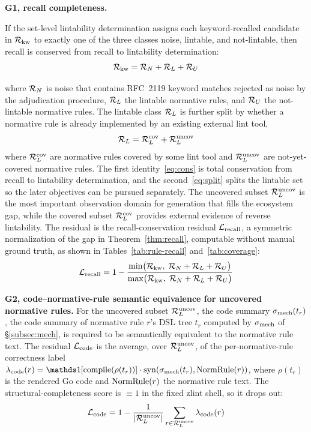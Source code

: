 \medskip
\noindent\textbf{G1, recall completeness.}
\begin{theorem}\label{thm:recall}
If the set-level lintability determination assigns each keyword-recalled candidate in
$\mathcal{R}_{\mathrm{kw}}$ to exactly one of the three classes noise, lintable, and
not-lintable, then recall is conserved from recall to lintability
determination:
\begin{equation}\label{eq:cons}
  \mathcal{R}_{\mathrm{kw}} = \mathcal{R}_N + \mathcal{R}_L + \mathcal{R}_U
\end{equation}
\end{theorem}
\noindent where $\mathcal{R}_N$ is noise that contains
RFC~2119 keyword matches rejected as noise by the adjudication procedure,
$\mathcal{R}_L$ the lintable normative rules, and $\mathcal{R}_U$
the not-lintable normative rules. The lintable class $\mathcal{R}_L$ is further split by whether
a normative rule is already implemented by an existing external lint tool,
\begin{equation}\label{eq:split}
  \mathcal{R}_L = \mathcal{R}_L^{\mathrm{cov}} + \mathcal{R}_L^{\mathrm{uncov}}
\end{equation}
where $\mathcal{R}_L^{\mathrm{cov}}$ are normative rules covered by some lint tool and $\mathcal{R}_L^{\mathrm{uncov}}$ are
not-yet-covered normative rules. The first identity~\eqref{eq:cons} is total conservation
from recall to lintability determination, and the second~\eqref{eq:split} splits the
lintable set so the later objectives can be pursued separately. The uncovered
subset $\mathcal{R}_L^{\mathrm{uncov}}$ is the most important observation domain for generation that
fills the ecosystem gap, while the covered subset $\mathcal{R}_L^{\mathrm{cov}}$ provides external
evidence of reverse lintability. The residual is the recall-conservation
residual $\mathcal{L}_{\mathrm{recall}}$, a symmetric normalization of the gap in
Theorem~\ref{thm:recall}, computable without manual ground truth, as shown in Tables~\ref{tab:rule-recall} and~\ref{tab:coverage}:
\begin{equation}\label{eq:recall-res}
  \mathcal{L}_{\mathrm{recall}} = 1 - \frac{\min\!\big(\mathcal{R}_{\mathrm{kw}},\; \mathcal{R}_N+\mathcal{R}_L+\mathcal{R}_U\big)}
  {\max\!\big(\mathcal{R}_{\mathrm{kw}},\; \mathcal{R}_N+\mathcal{R}_L+\mathcal{R}_U\big)}
\end{equation}

\medskip
\noindent\textbf{G2, code--normative-rule semantic equivalence for uncovered normative rules.} For the
uncovered subset $\mathcal{R}_L^{\mathrm{uncov}}$, the code summary $\sigma_{\mathrm{mech}}(t_r)$, the code summary of
normative rule $r$'s DSL tree $t_r$ computed by $\sigma_{\mathrm{mech}}$ of \S\ref{subsec:mech}, is
required to be semantically equivalent to the normative rule text.
The residual $\mathcal{L}_{\mathrm{code}}$ is the average, over $\mathcal{R}_L^{\mathrm{uncov}}$, of the per-normative-rule correctness
label $\lambda_{\mathrm{code}}(r) = \ind[\mathrm{compile}(\rho(t_r))] \cdot
\mathrm{syn}(\smech(t_r), \normrule(r))$, where $\rho(t_r)$ is the rendered Go
code and $\mathrm{NormRule}(r)$ the normative rule text. The structural-completeness score is
$\equiv 1$ in the fixed zlint shell, so it drops out:
\begin{equation}\label{eq:code-res}
  \mathcal{L}_{\mathrm{code}} = 1 - \frac{1}{|\mathcal{R}_L^{\mathrm{uncov}}|}\sum_{r\in\mathcal{R}_L^{\mathrm{uncov}}}\lambda_{\mathrm{code}}(r)
\end{equation}

